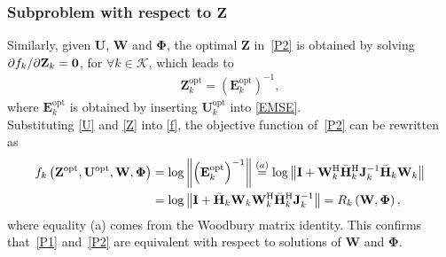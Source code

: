 \documentclass[12pt, draftclsnofoot, onecolumn]{IEEEtran}
\begin{document}
\subsubsection{Subproblem with respect to $\mathbf{Z}$}
Similarly, given $\mathbf{U}$, $\mathbf{W}$ and $\mathbf{\Phi}$, the optimal $\mathbf{Z}$ in~\eqref{P2} is obtained by solving ${{\partial {f_{k}}} \mathord{\left/
{\vphantom {{\partial {f_{k}}} {\partial {\mathbf{Z}_k}}}} \right.\kern-\nulldelimiterspace} {\partial {\mathbf{Z}_k}}}=\mathbf{0}$, for $ \forall k \in \mathcal{K}$, which leads to
\begin{equation}\label{Z}
\begin{aligned}
\mathbf{Z}_k^{\text{opt}}=\left({\mathbf{E}}_k^{\text{opt}}\right)^{-1},
\end{aligned}
\end{equation}
where ${\mathbf{E}}_k^{\text{opt}}$ is obtained by inserting $\mathbf{U}_k^{\text{opt}}$ into \eqref{EMSE}.\\
\indent Substituting \eqref{U} and \eqref{Z} into \eqref{f}, the objective function of~\eqref{P2} can be rewritten as
\begin{equation}
\begin{aligned}
f_k\left(\mathbf{Z}^{\text{opt}},\mathbf{U}^{\text{opt}},\mathbf{W},\mathbf{\Phi}\right)&=\log\left\|\left({\mathbf{E}}_k^{\text{opt}}\right)^{-1}\right\|\buildrel (a) \over=\log\left\|\mathbf{I}+\mathbf{W}_k^\mathrm{H}\bar{\mathbf{H}}_k^\mathrm{H}\mathbf{J}_k^{-1}\bar{\mathbf{H}}_k\mathbf{W}_k\right\|\\
&=\log\left\|\mathbf{I}+\bar{\mathbf{H}}_k\mathbf{W}_k\mathbf{W}_k^\mathrm{H}\bar{\mathbf{H}}_k^\mathrm{H}\mathbf{J}_k^{-1}\right\|=R_k\left(\mathbf{W},\mathbf{\Phi}\right),
\end{aligned}
\end{equation}
where equality (a) comes from the Woodbury matrix identity. This confirms that~\eqref{P1} and~\eqref{P2} are equivalent with respect to solutions of $\mathbf{W}$ and $\mathbf{\Phi}$.
\end{document}

